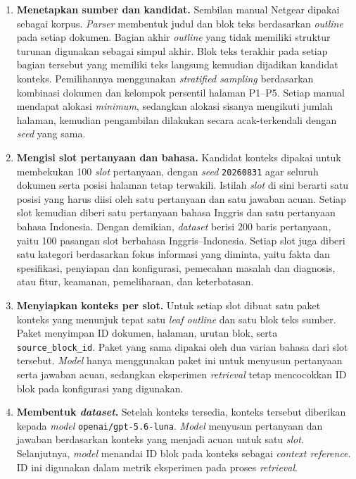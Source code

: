 \begin{enumerate}[leftmargin=*, itemsep=0.25em]
  \item \textbf{Menetapkan sumber dan kandidat.} Sembilan manual Netgear dipakai sebagai korpus.
  \emph{Parser} membentuk judul dan blok teks berdasarkan \emph{outline} pada setiap dokumen. Bagian
  akhir \emph{outline} yang tidak memiliki struktur turunan digunakan sebagai simpul akhir. Blok teks
  terakhir pada setiap bagian tersebut yang memiliki teks langsung kemudian dijadikan kandidat konteks.
  Pemilihannya menggunakan \emph{stratified sampling} berdasarkan kombinasi dokumen dan kelompok
  persentil halaman P1--P5. Setiap manual mendapat alokasi \emph{minimum}, sedangkan alokasi sisanya mengikuti
  jumlah halaman, kemudian pengambilan dilakukan secara acak-terkendali dengan \emph{seed} yang sama.
  \item \textbf{Mengisi slot pertanyaan dan bahasa.} Kandidat konteks dipakai untuk membekukan
  100 \emph{slot} pertanyaan, dengan \emph{seed} \texttt{20260831} agar seluruh dokumen serta
  posisi halaman tetap terwakili. Istilah \emph{slot} di sini berarti satu posisi yang harus diisi
  oleh satu pertanyaan dan satu jawaban acuan. Setiap slot kemudian diberi satu pertanyaan bahasa Inggris dan
  satu pertanyaan bahasa Indonesia. Dengan demikian, \emph{dataset} berisi 200 baris pertanyaan,
  yaitu 100 pasangan slot berbahasa Inggris--Indonesia. Setiap slot juga diberi satu kategori
  berdasarkan fokus informasi yang diminta, yaitu fakta dan spesifikasi, penyiapan dan konfigurasi,
  pemecahan masalah dan diagnosis, atau fitur, keamanan, pemeliharaan, dan keterbatasan.
  \item \textbf{Menyiapkan konteks per slot.} Untuk setiap slot dibuat satu paket konteks yang
  menunjuk tepat satu \emph{leaf outline} dan satu blok teks sumber. Paket menyimpan ID dokumen,
  halaman, urutan blok, serta \texttt{source\_block\_id}. Paket yang sama dipakai oleh dua varian bahasa
  dari slot tersebut. \emph{Model} hanya menggunakan paket ini untuk menyusun pertanyaan serta jawaban
  acuan, sedangkan eksperimen \emph{retrieval} tetap mencocokkan ID blok pada konfigurasi yang digunakan.
  \item \textbf{Membentuk \emph{dataset}.} Setelah konteks tersedia, konteks tersebut diberikan kepada
  \emph{model} \texttt{openai/gpt-5.6-luna}. \emph{Model} menyusun pertanyaan dan jawaban berdasarkan konteks yang menjadi
  acuan untuk satu \emph{slot}. Selanjutnya, \emph{model} menandai ID blok pada konteks sebagai
  \emph{context reference}. ID ini digunakan dalam metrik eksperimen pada proses \emph{retrieval}.
\end{enumerate}

